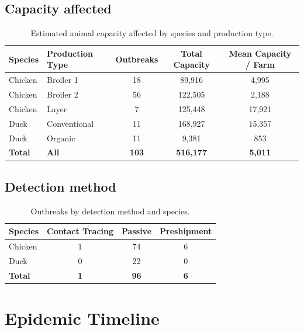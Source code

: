 \documentclass[
]{article}
\begin{document}
\subsection{Capacity affected}\label{capacity-affected}

\begin{longtable}[t]{llccc}

\caption{\label{tbl-capacity}Estimated animal capacity affected by
species and production type.}

\tabularnewline

\toprule
Species & Production Type & Outbreaks & Total Capacity & Mean Capacity / Farm\\
\midrule
Chicken & Broiler 1 & 18 & 89,916 & 4,995\\
Chicken & Broiler 2 & 56 & 122,505 & 2,188\\
Chicken & Layer & 7 & 125,448 & 17,921\\
Duck & Conventional & 11 & 168,927 & 15,357\\
Duck & Organic & 11 & 9,381 & 853\\
\addlinespace
\textbf{Total} & \textbf{All} & \textbf{103} & \textbf{516,177} & \textbf{5,011}\\
\bottomrule

\end{longtable}

\subsection{Detection method}\label{detection-method}

\begin{longtable}[t]{lccc}

\caption{\label{tbl-detection}Outbreaks by detection method and
species.}

\tabularnewline

\toprule
Species & Contact Tracing & Passive & Preshipment\\
\midrule
Chicken & 1 & 74 & 6\\
Duck & 0 & 22 & 0\\
\textbf{Total} & \textbf{1} & \textbf{96} & \textbf{6}\\
\bottomrule

\end{longtable}

\section{Epidemic Timeline}\label{epidemic-timeline}
\end{document}
